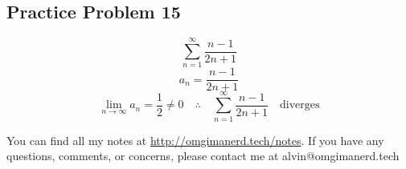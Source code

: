 \documentclass{math}
\begin{document}
\subsection*{Practice Problem 15}
\[ \sum_{n=1}^{\infty}\frac{n-1}{2n+1} \]
\[ a_{n} = \frac{n-1}{2n+1} \]
\[ \lim_{n\to\infty}a_{n} = \frac{1}{2} \neq 0 \quad \therefore \quad
   \sum_{n=1}^{\infty}\frac{n-1}{2n+1} \quad \mathrm{diverges} \]

\begin{center}
  You can find all my notes at \url{http://omgimanerd.tech/notes}. If you have
  any questions, comments, or concerns, please contact me at
  alvin@omgimanerd.tech
\end{center}
\end{document}
